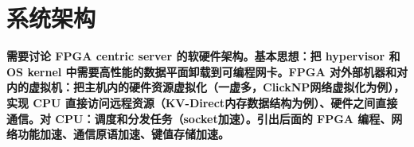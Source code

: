 \chapter{系统架构}

\textbf{需要讨论 FPGA centric server 的软硬件架构。基本思想：把 hypervisor 和 OS kernel 中需要高性能的数据平面卸载到可编程网卡。FPGA 对外部机器和对内的虚拟机：把主机内的硬件资源虚拟化（一虚多，ClickNP网络虚拟化为例），实现 CPU 直接访问远程资源（KV-Direct内存数据结构为例）、硬件之间直接通信。对 CPU：调度和分发任务（socket加速）。引出后面的 FPGA 编程、网络功能加速、通信原语加速、键值存储加速。}
